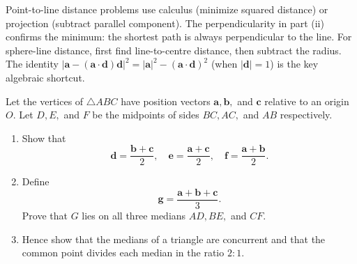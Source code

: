 \begin{takeaways}
Point-to-line distance problems use calculus (minimize squared distance) or projection (subtract parallel component). The perpendicularity in part (ii) confirms the minimum: the shortest path is always perpendicular to the line. For sphere-line distance, first find line-to-centre distance, then subtract the radius. The identity $|\mathbf{a} - (\mathbf{a} \cdot \mathbf{d})\mathbf{d}|^2 = |\mathbf{a}|^2 - (\mathbf{a} \cdot \mathbf{d})^2$ (when $|\mathbf{d}|=1$) is the key algebraic shortcut.
\end{takeaways}

\vspace{1em}

\begin{problem}
Let the vertices of $\triangle ABC$ have position vectors $\mathbf{a}, \mathbf{b},$ and $\mathbf{c}$ relative to an origin $O$. Let $D, E,$ and $F$ be the midpoints of sides $BC, AC,$ and $AB$ respectively.
\begin{enumerate}[label=(\roman*)]
    \item Show that
    \[
    \mathbf{d} = \frac{\mathbf{b} + \mathbf{c}}{2}, \quad
    \mathbf{e} = \frac{\mathbf{a} + \mathbf{c}}{2}, \quad
    \mathbf{f} = \frac{\mathbf{a} + \mathbf{b}}{2}.
    \]
    \item Define
    \[
    \mathbf{g} = \frac{\mathbf{a} + \mathbf{b} + \mathbf{c}}{3}.
    \]
    Prove that $G$ lies on all three medians $AD, BE,$ and $CF$.
    \item Hence show that the medians of a triangle are concurrent and that the common point divides each median in the ratio $2:1$.
\end{enumerate}
\end{problem}

